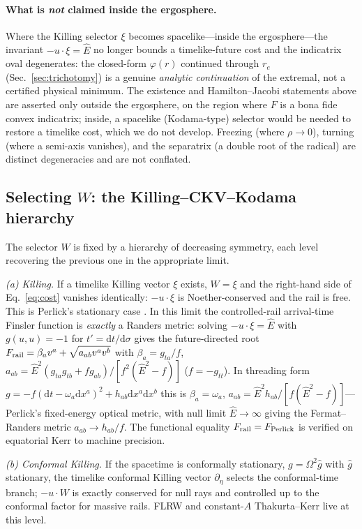 \documentclass[
    aps, prd, twocolumn, superscriptaddress,
    showpacs, nofootinbib, floatfix
]{revtex4-2}
\newcommand{\Ehat}{\hat E}
\newcommand{\re}{r_{e}}
\newcommand{\dd}{\mathrm{d}}
\begin{document}
\paragraph{What is \emph{not} claimed inside the ergosphere.} Where the Killing
selector $\xi$ becomes spacelike---inside the ergosphere---the invariant
$-u\cdot\xi=\Ehat$ no longer bounds a timelike-future cost and the indicatrix oval
degenerates: the closed-form $\varphi(r)$ continued through $\re$
(Sec.~\ref{sec:trichotomy}) is a genuine \emph{analytic continuation} of the
extremal, not a certified physical minimum. The existence and Hamilton--Jacobi
statements above are asserted only outside the ergosphere, on the region where $F$
is a bona fide convex indicatrix; inside, a spacelike (Kodama-type) selector would
be needed to restore a timelike cost, which we do not develop. Freezing (where
$\rho\to0$), turning (where a semi-axis vanishes), and the separatrix (a double
root of the radical) are distinct degeneracies and are not conflated.

\subsection{Selecting $W$: the Killing--CKV--Kodama hierarchy}
\label{sec:whierarchy}
The selector $W$ is fixed by a hierarchy of decreasing symmetry, each level
recovering the previous one in the appropriate limit.

\emph{(a) Killing.} If a timelike Killing vector $\xi$ exists, $W=\xi$ and the
right-hand side of Eq.~\eqref{eq:cost} vanishes identically: $-u\cdot\xi$ is
Noether-conserved and the rail is free. This is Perlick's stationary case
\cite{Perlick1991}. In this limit the controlled-rail arrival-time Finsler
function is \emph{exactly} a Randers metric: solving $-u\cdot\xi=\Ehat$ with
$g(u,u)=-1$ for $t'=\dd t/\dd\sigma$ gives the future-directed root
$F_{\rm rail}=\beta_a v^a+\sqrt{a_{ab}v^a v^b}$ with $\beta_a=g_{ta}/f$,
$a_{ab}=\Ehat^2(g_{ta}g_{tb}+f g_{ab})/[f^2(\Ehat^2-f)]$ ($f=-g_{tt}$). In threading
form $g=-f(\dd t-\omega_a\dd x^a)^2+h_{ab}\dd x^a\dd x^b$ this is $\beta_a=\omega_a$,
$a_{ab}=\Ehat^2 h_{ab}/[f(\Ehat^2-f)]$---Perlick's fixed-energy optical metric, with
null limit $\Ehat\to\infty$ giving the Fermat--Randers metric $a_{ab}\to h_{ab}/f$.
The functional equality $F_{\rm rail}=F_{\rm Perlick}$ is verified on equatorial Kerr
to machine precision.

\emph{(b) Conformal Killing.} If the spacetime is conformally stationary,
$g=\Omega^2\hat g$ with $\hat g$ stationary, the timelike conformal Killing
vector $\partial_\eta$ selects the conformal-time branch; $-u\cdot W$ is exactly
conserved for null rays and controlled up to the conformal factor for massive
rails. FLRW and constant-$A$ Thakurta--Kerr live at this level.
\end{document}
